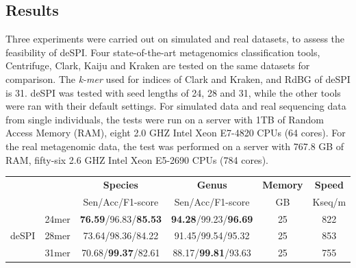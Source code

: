 \documentclass[a0,portrait]{a0poster}
\begin{document}
\begin{multicols}{2}
\section*{Results}
Three experiments were carried out on simulated and real datasets, to assess the feasibility of deSPI. Four state-of-the-art metagenomics classification tools, Centrifuge, Clark, Kaiju and Kraken are tested on the same datasets for comparison. The \textit{k-mer} used for indices of Clark and Kraken, and RdBG of deSPI is 31. deSPI was tested with seed lengths of 24, 28 and 31, while the other tools were ran with their default settings. For simulated data and real sequencing data from single individuals, the tests were run on a server with 1TB of Random Access Memory (RAM), eight 2.0 GHZ Intel Xeon E7-4820 CPUs (64 cores). For the real metagenomic data, the test was performed on a server with 767.8 GB of RAM, fifty-six 2.6 GHZ Intel Xeon E5-2690 CPUs (784 cores). 
\begin{center}\vspace{1cm}
\small
\begin{tabular}{cccccc}
\toprule
& & \textbf{Species} & \textbf{Genus} & \textbf{Memory} & \textbf{Speed} \\
\cline{3-6}
& & Sen/Acc/F1-score & Sen/Acc/F1-score  & GB & Kseq/m \\
\midrule
& 24mer & \textbf{76.59}/96.83/\textbf{85.53} & \textbf{94.28}/99.23/\textbf{96.69} & 25 & 822 \\ 
deSPI & 28mer & 73.64/98.36/84.22 & 91.45/99.54/95.32 & 25 & 853 \\
& 31mer & 70.68/\textbf{99.37}/82.61 & 88.17/\textbf{99.81}/93.63 & 25 & 755 \\

\end{tabular}
\end{center}
\end{multicols}
\end{document}

